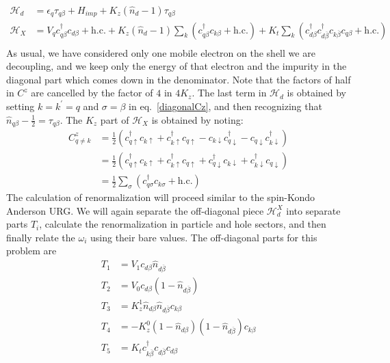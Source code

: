\documentclass[twoside,11pt]{report}
\numberwithin{equation}{section}
\begin{document}
\begin{equation}\begin{aligned}
	\mathcal{H}_d &= \epsilon_q \tau_{q\beta} + H_{imp} + K_z \left(\hat n_d -1\right)\tau_{q\beta}\\
	\mathcal{H}_X &= V_qc^\dagger_{q\beta}c_{d\beta} + \text{h.c.} + K_z \left(\hat n_d -1\right)\sum_k \left(c^\dagger_{q\beta}c_{k\beta} + \text{h.c.}\right) + K_t \sum_k \left(c^\dagger_{d\beta}c^\dagger_{d\overline\beta}c_{k\overline\beta}c_{q\beta} + \text{h.c.}\right) \\
\end{aligned}\end{equation}
As usual, we have considered only one mobile electron on the shell we are decoupling, and we keep only the energy of that electron and the impurity in the diagonal part which comes down in the denominator.
Note that the factors of half in \(C^z\) are cancelled by the factor of \(4\) in \(4K_z\).
The last term in \(\mathcal{H}_d\) is obtained by setting \(k=k^\prime=q\) and \(\sigma=\beta\) in eq.~\ref{diagonalCz}, and then recognizing that \(\hat n_{q\beta} - \frac{1}{2} = \tau_{q\beta}\).
The \(K_z\) part of \(\mathcal{H}_X\) is obtained by noting:
\begin{equation}\begin{aligned}
	C^z_{q\neq k} &= \frac{1}{2}\left(c^\dagger_{q\uparrow}c_{k \uparrow} + c^\dagger_{k\uparrow}c_{q \uparrow} - c_{k\downarrow}c^\dagger_{q \downarrow} - c_{q\downarrow}c^\dagger_{k\downarrow}\right) \\
		      &= \frac{1}{2}\left(c^\dagger_{q\uparrow}c_{k \uparrow} + c^\dagger_{k\uparrow}c_{q \uparrow} + c^\dagger_{q \downarrow}c_{k\downarrow} + c^\dagger_{k\downarrow}c_{q\downarrow}\right)\\
	&= \frac{1}{2}\sum_{\sigma}\left(c^\dagger_{q\sigma}c_{k\sigma} + \text{h.c.}\right)
\end{aligned}\end{equation}
The calculation of renormalization will proceed similar to the spin-Kondo Anderson URG.
We will again separate the off-diagonal piece \(\mathcal{H}_d^X\) into separate parts \(T_i\), calculate the renormalization in particle and hole sectors, and then finally relate the \(\omega_i\) using their bare values.
The off-diagonal parts for this problem are
\begin{equation}\begin{aligned}
	T_1 &= V_1 c_{d\beta}\hat n_{d\overline\beta}\\
	T_2 &= V_0 c_{d\beta}\left(1 - \hat n_{d\overline\beta}\right)\\
	T_3 &= K_z^1 \hat n_{d\beta}\hat n_{d\overline\beta}c_{k\beta}\\
	T_4 &= -K_z^0 \left(1 - \hat n_{d\beta}\right)\left(1 - \hat n_{d\overline\beta}\right)c_{k\beta}\\
	T_5 &= K_t c^\dagger_{k\overline\beta}c_{d\overline\beta}c_{d\beta}\\
\end{aligned}\end{equation}
\end{document}
